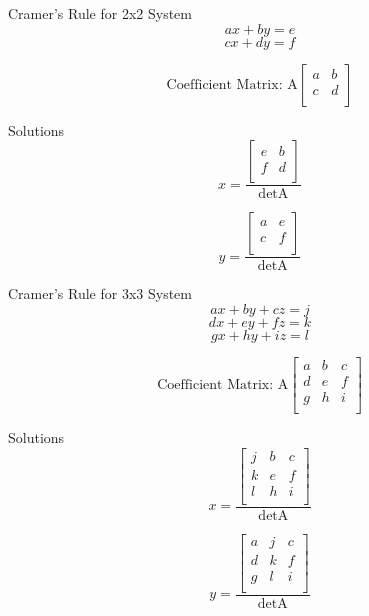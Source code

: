 \documentclass[12pt]{article}
\numberwithin{equation}{subsection}
\begin{document}
\begin{flushleft}


Cramer's Rule for 2x2 System
$$ax+by=e$$
$$cx+dy=f$$

$$\textrm{Coefficient Matrix: A} 
\begin{bmatrix}
a & b \\
c & d \\
\end{bmatrix}$$
\newpage

Solutions 
\begin{equation}
x=\frac{\begin{bmatrix}
e & b \\
f & d \\
\end{bmatrix}}{\textrm{detA}}
\end{equation}

\begin{equation}
y=\frac{\begin{bmatrix}
a & e \\
c & f \\
\end{bmatrix}}{\textrm{detA}}
\end{equation}

Cramer's Rule for 3x3 System
$$ax+by+cz=j$$
$$dx+ey+fz=k$$
$$gx+hy+iz=l$$

$$\textrm{Coefficient Matrix: A} 
\begin{bmatrix}
a & b & c\\
d & e & f \\
g & h & i \\
\end{bmatrix}$$

Solutions 
\begin{equation}
x=\frac{\begin{bmatrix}
j & b & c\\
k & e & f \\
l & h & i \\
\end{bmatrix}}{\textrm{detA}}
\end{equation}

\begin{equation}
y=\frac{\begin{bmatrix}
a & j & c\\
d & k & f \\
g & l & i \\
\end{bmatrix}}{\textrm{detA}}
\end{equation}


\end{flushleft}
\end{document}

